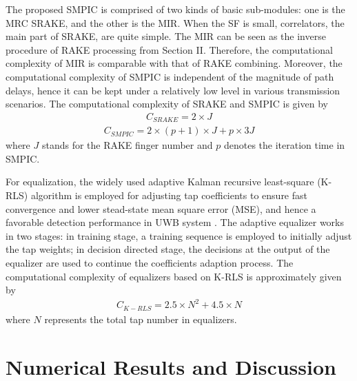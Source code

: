 \documentclass[journal]{IEEEtran}
\begin{document}
The proposed SMPIC is comprised of two kinds of basic sub-modules:
one is the MRC SRAKE, and the other is the MIR. When the SF is
small, correlators, the main part of SRAKE, are quite simple. The
MIR can be seen as the inverse procedure of RAKE processing from
Section II. Therefore, the computational complexity of MIR is
comparable with that of RAKE combining. Moreover, the computational
complexity of SMPIC is independent of the magnitude of path delays,
hence it can be kept under a relatively low level in various
transmission scenarios. The computational complexity of SRAKE and
SMPIC is given by
\begin{equation}
\label{SRAKE-Complexity}
\begin{aligned}
C_{SRAKE}=2\times J
\end{aligned}
\end{equation}
\begin{equation}
\label{SMPIC-Complexity}
\begin{aligned}
C_{SMPIC}=2\times (p+1)\times J +p\times3J
\end{aligned}
\end{equation}
where $J$ stands for the RAKE finger number and $p$ denotes the
iteration time in SMPIC.

For equalization, the widely used adaptive Kalman recursive
least-square (K-RLS) algorithm is employed for adjusting tap
coefficients to ensure fast convergence and lower stead-state mean
square error (MSE), and hence a favorable detection performance in
UWB system \cite{RLS_advan}. The adaptive equalizer works in two
stages: in training stage, a training sequence is employed to
initially adjust the tap weights; in decision directed stage, the
decisions at the output of the equalizer are used to continue the
coefficients adaption process. The computational complexity of
equalizers based on K-RLS is approximately given by \cite{Proakis}
\begin{equation}
\label{CRLS-Complexity}
\begin{aligned}
C_{K-RLS}=2.5\times N^2+4.5\times N
\end{aligned}
\end{equation}
where $N$ represents the total tap number in equalizers.


\section{Numerical Results and Discussion}
\end{document}
